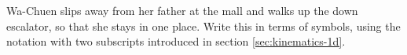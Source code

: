 Wa-Chuen slips away from her father at the mall and walks
up the down escalator, so that she stays in one place. Write
this in terms of symbols, using the notation with two subscripts
introduced in section \ref{sec:kinematics-1d}.

